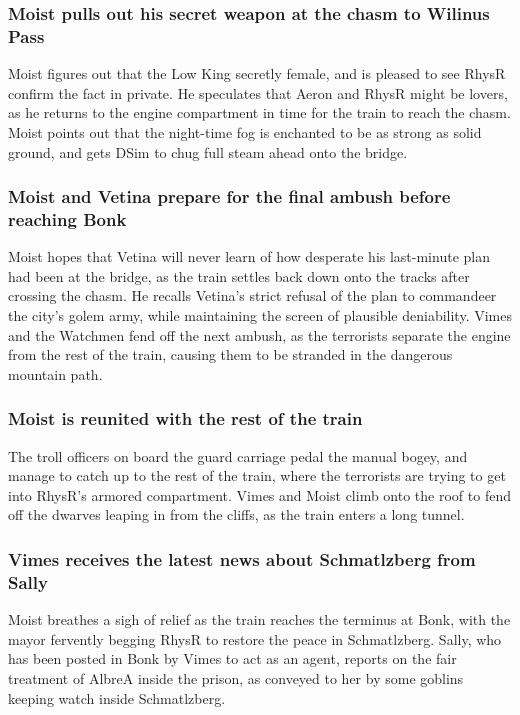 \subsubsection{\Gls{Moist} pulls out his secret weapon at the chasm to Wilinus Pass}
\Gls{Moist} figures out that the Low King secretly female, and is pleased to see \Gls{RhysR}
confirm the fact in private. He speculates that \Gls{Aeron} and \Gls{RhysR} might be lovers, as he
returns to the engine compartment in time for the train to reach the chasm. \Gls{Moist} points out
that the night-time fog is enchanted to be as strong as solid ground, and gets \Gls{DSim} to
chug full steam ahead onto the bridge.

\subsubsection{\Gls{Moist} and \Gls{Vetina} prepare for the final ambush before reaching Bonk}
\Gls{Moist} hopes that \Gls{Vetina} will never learn of how desperate his last-minute plan had been
at the bridge, as the train settles back down onto the tracks after crossing the chasm. He recalls
\Gls{Vetina}'s strict refusal of the plan to commandeer the city's golem army, while maintaining the
screen of plausible deniability. \Gls{Vimes} and the Watchmen fend off the next ambush, as the
terrorists separate the engine from the rest of the train, causing them to be stranded in the
dangerous mountain path.

\subsubsection{\Gls{Moist} is reunited with the rest of the train}
The troll officers on board the guard carriage pedal the manual bogey, and manage to catch up to the
rest of the train, where the terrorists are trying to get into \Gls{RhysR}'s armored compartment.
\Gls{Vimes} and \Gls{Moist} climb onto the roof to fend off the dwarves leaping in from the
cliffs, as the train enters a long tunnel.

\subsubsection{\Gls{Vimes} receives the latest news about Schmatlzberg from \Gls{Sally}}
\Gls{Moist} breathes a sigh of relief as the train reaches the terminus at Bonk, with the mayor
fervently begging \Gls{RhysR} to restore the peace in Schmatlzberg. \Gls{Sally}, who has been
posted in Bonk by \Gls{Vimes} to act as an agent, reports on the fair treatment of \Gls{AlbreA}
inside the prison, as conveyed to her by some goblins keeping watch inside Schmatlzberg.

